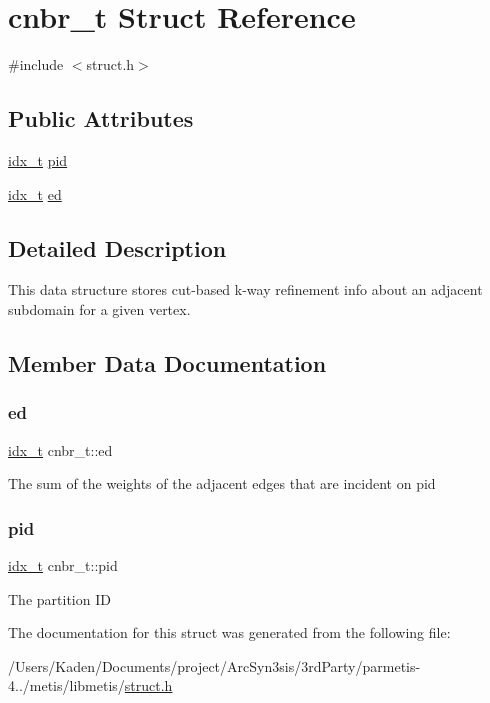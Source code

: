 \hypertarget{a00714}{}\section{cnbr\+\_\+t Struct Reference}
\label{a00714}


{\ttfamily \#include $<$struct.\+h$>$}

\subsection*{Public Attributes}
\begin{DoxyCompactItemize}
\item 
\hyperlink{a00876_aaa5262be3e700770163401acb0150f52}{idx\+\_\+t} \hyperlink{a00714_a22be164ee3de87a051946a9ab71ae3b9}{pid}
\item 
\hyperlink{a00876_aaa5262be3e700770163401acb0150f52}{idx\+\_\+t} \hyperlink{a00714_a2dd27d862ee4554553d909072a8931f3}{ed}
\end{DoxyCompactItemize}


\subsection{Detailed Description}
This data structure stores cut-\/based k-\/way refinement info about an adjacent subdomain for a given vertex. 

\subsection{Member Data Documentation}
\mbox{\label{a00714_a2dd27d862ee4554553d909072a8931f3}} 
\subsubsection{\texorpdfstring{ed}{ed}}
{\footnotesize\ttfamily \hyperlink{a00876_aaa5262be3e700770163401acb0150f52}{idx\+\_\+t} cnbr\+\_\+t\+::ed}

The sum of the weights of the adjacent edges that are incident on pid \mbox{\label{a00714_a22be164ee3de87a051946a9ab71ae3b9}} 
\subsubsection{\texorpdfstring{pid}{pid}}
{\footnotesize\ttfamily \hyperlink{a00876_aaa5262be3e700770163401acb0150f52}{idx\+\_\+t} cnbr\+\_\+t\+::pid}

The partition ID 

The documentation for this struct was generated from the following file\+:\begin{DoxyCompactItemize}
\item 
/\+Users/\+Kaden/\+Documents/project/\+Arc\+Syn3sis/3rd\+Party/parmetis-\/4../metis/libmetis/\hyperlink{a00972}{struct.\+h}\end{DoxyCompactItemize}
